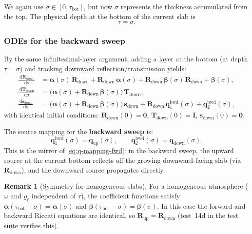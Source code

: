 \documentclass[11pt,a4paper]{article}
\newcommand{\vect}[1]{\bm{#1}}
\newcommand{\mat}[1]{\mathbf{#1}}
\newcommand{\tbot}{\tau_{\mathrm{bot}}}
\newcommand{\dd}{\,\mathrm{d}}
\theoremstyle{definition}
\newtheorem{remark}{Remark}
\begin{document}
We again use $\sigma \in [0, \tbot]$, but now $\sigma$ represents the
thickness accumulated from the top.  The physical depth at the bottom
of the current slab is
\begin{equation}\label{eq:tau-sigma-bwd}
  \tau = \sigma.
\end{equation}

\subsubsection{ODEs for the backward sweep}

By the same infinitesimal-layer argument, adding a layer at the bottom
(at depth $\tau = \sigma$) and tracking downward reflection/transmission
yields:
\begin{align}
  \frac{\dd\mat{R}_{\mathrm{down}}}{\dd\sigma}
  &= \mat{\alpha}(\sigma)\,\mat{R}_{\mathrm{down}}
     + \mat{R}_{\mathrm{down}}\,\mat{\alpha}(\sigma)
     + \mat{R}_{\mathrm{down}}\,\mat{\beta}(\sigma)\,\mat{R}_{\mathrm{down}}
     + \mat{\beta}(\sigma),
  \label{eq:riccati-R-bwd} \\
  \frac{\dd\mat{T}_{\mathrm{down}}}{\dd\sigma}
  &= \bigl(\mat{\alpha}(\sigma)
     + \mat{R}_{\mathrm{down}}\,\mat{\beta}(\sigma)\bigr)\,
     \mat{T}_{\mathrm{down}},
  \label{eq:companion-T-bwd} \\
  \frac{\dd\vect{s}_{\mathrm{down}}}{\dd\sigma}
  &= \bigl(\mat{\alpha}(\sigma)
     + \mat{R}_{\mathrm{down}}\,\mat{\beta}(\sigma)\bigr)\,
     \vect{s}_{\mathrm{down}}
     + \mat{R}_{\mathrm{down}}\,\vect{q}_1^{\mathrm{bwd}}(\sigma)
     + \vect{q}_2^{\mathrm{bwd}}(\sigma),
  \label{eq:companion-s-bwd}
\end{align}
with identical initial conditions:
$\mat{R}_{\mathrm{down}}(0) = \mat{0}$,
$\mat{T}_{\mathrm{down}}(0) = \mat{I}$,
$\vect{s}_{\mathrm{down}}(0) = \vect{0}$.

The source mapping for the \textbf{backward sweep} is:
\begin{equation}\label{eq:q-mapping-bwd}
  \vect{q}_1^{\mathrm{bwd}}(\sigma) = \vect{q}_{\mathrm{up}}(\sigma),
  \qquad
  \vect{q}_2^{\mathrm{bwd}}(\sigma) = \vect{q}_{\mathrm{down}}(\sigma).
\end{equation}
This is the mirror of \eqref{eq:q-mapping-fwd}: in the backward sweep,
the upward source at the current bottom reflects off the growing
downward-facing slab (via $\mat{R}_{\mathrm{down}}$), and the downward
source propagates directly.

\begin{remark}[Symmetry for homogeneous slabs]
For a homogeneous atmosphere ($\omega$ and $g_\ell$ independent of
$\tau$), the coefficient functions satisfy $\mat{\alpha}(\tbot - \sigma)
= \mat{\alpha}(\sigma)$ and $\mat{\beta}(\tbot - \sigma) =
\mat{\beta}(\sigma)$.  In this case the forward and backward Riccati
equations are identical, so $\mat{R}_{\mathrm{up}} =
\mat{R}_{\mathrm{down}}$ (test~14d in the test suite verifies this).
\end{remark}
\end{document}
